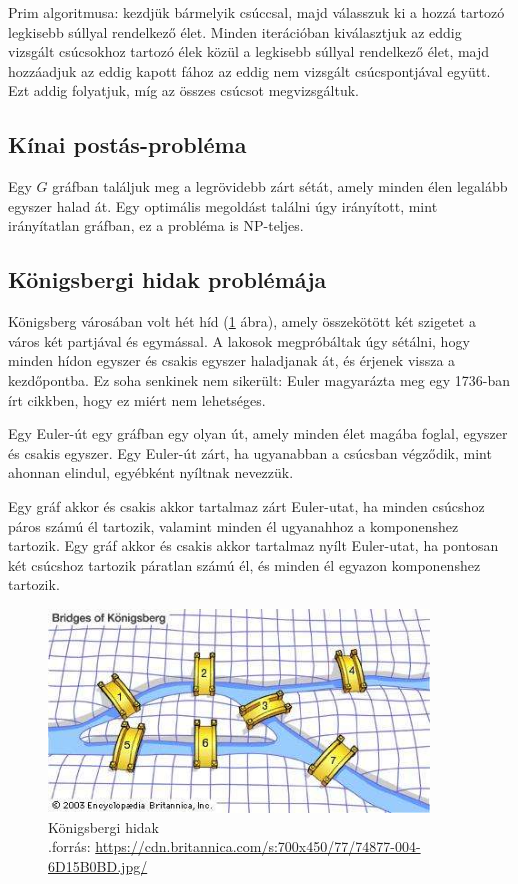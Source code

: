 Prim algoritmusa: kezdjük bármelyik csúccsal, majd válasszuk ki a hozzá tartozó legkisebb súllyal rendelkező élet. Minden iterációban kiválasztjuk az eddig vizsgált csúcsokhoz tartozó élek közül a legkisebb súllyal rendelkező élet, majd hozzáadjuk az eddig kapott fához az eddig nem vizsgált csúcspontjával együtt. Ezt addig folyatjuk, míg az összes csúcsot megvizsgáltuk.

\subsection{Kínai postás-probléma}

Egy \(G\) gráfban találjuk meg a legrövidebb zárt sétát, amely minden élen legalább egyszer halad át. Egy optimális megoldást találni úgy irányított, mint irányítatlan gráfban, ez a probléma is NP-teljes.

\subsection{Königsbergi hidak problémája}

Königsberg városában volt hét híd (\ref{fig:ALAP:sm1} ábra), amely összekötött két szigetet a város két partjával és egymással. A lakosok megpróbáltak úgy sétálni, hogy minden hídon egyszer és csakis egyszer haladjanak át, és érjenek vissza a kezdőpontba. Ez soha senkinek nem sikerült: Euler magyarázta meg egy 1736-ban írt cikkben, hogy ez miért nem lehetséges.

Egy Euler-út egy gráfban egy olyan út, amely minden élet magába foglal, egyszer és csakis egyszer. Egy Euler-út zárt, ha ugyanabban a csúcsban végződik, mint ahonnan elindul, egyébként nyíltnak nevezzük.

Egy gráf akkor és csakis akkor tartalmaz zárt Euler-utat, ha minden csúcshoz páros számú él tartozik, valamint minden él ugyanahhoz a komponenshez tartozik. Egy gráf akkor és csakis akkor tartalmaz nyílt Euler-utat, ha pontosan két csúcshoz tartozik páratlan számú él, és minden él egyazon komponenshez tartozik.

\begin{figure}
	\centering
	\setlength{\abovecaptionskip}{0pt}
	\setlength{\belowcaptionskip}{0pt}
	\includegraphics[width=0.9\textwidth, scale=0.9]{images/konigsberg}
	\caption[]%
	{Königsbergi hidak\\
		{\white .}\hfill{forrás: }\url{https://cdn.britannica.com/s:700x450/77/74877-004-6D15B0BD.jpg/}}
	\label{fig:ALAP:sm1}
\end{figure}

